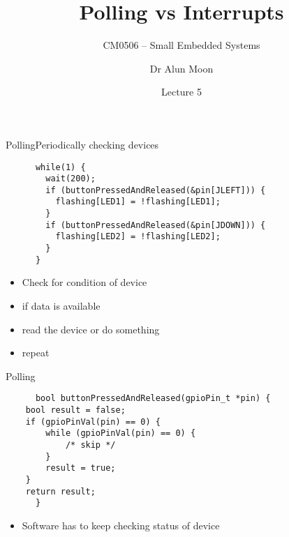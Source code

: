 \documentclass[svgnames,x11names]{beamer}
\title{Polling vs Interrupts}
\subtitle{CM0506 -- Small Embedded Systems}
\date{Lecture 5}
\author{Dr Alun Moon}
\institute{Department of Computer and Information Science}
\begin{document}
\frame\maketitle

\begin{frame}[fragile]{Polling}{Periodically checking devices}
  \begin{block}{}
    \begin{verbatim}
      while(1) {
        wait(200);
        if (buttonPressedAndReleased(&pin[JLEFT])) {
          flashing[LED1] = !flashing[LED1];
        }
        if (buttonPressedAndReleased(&pin[JDOWN])) {
          flashing[LED2] = !flashing[LED2];
        }
      }
    \end{verbatim}
  \end{block}
  \begin{itemize}
  \item Check for condition of device
  \item if data is available
  \item read the device or do something
  \item repeat
  \end{itemize}
\end{frame}

\begin{frame}[fragile]{Polling}
  \begin{block}{}
    \begin{verbatim}
      bool buttonPressedAndReleased(gpioPin_t *pin) {
	bool result = false;
	if (gpioPinVal(pin) == 0) {
		while (gpioPinVal(pin) == 0) {
			/* skip */
		}
		result = true;
	}
	return result;
      }
    \end{verbatim}
  \end{block}
  \begin{itemize}
  \item Software has to keep checking status of device
  \end{itemize}
\end{frame}
\end{document}
